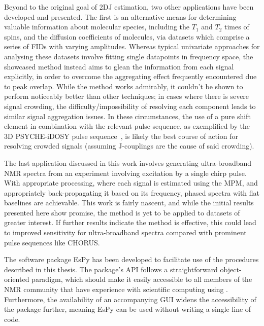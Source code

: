 Beyond to the original goal of \ac{2DJ} estimation, two other applications
have been developed and presented. The first is an alternative means for
determining valuable information about molecular species, including the $T_1$
and $T_2$ times of spins, and the diffusion coefficients of molecules, via
datasets which comprise a series of \acp{FID} with varying amplitudes. Whereas
typical univariate
approaches for analysing these datasets involve fitting single datapoints in
frequency space, the showcased method instead aims to glean the
information from each signal explicitly, in order to overcome the aggregating
effect frequently encountered due to peak overlap. While the method works
admirably,
it couldn't be shown to perform noticeably better than other techniques; in
cases where there is severe signal crowding, the difficulty/impossibility of
resolving each component leads to similar signal aggregation issues.
In these circumstances, the use of a pure shift element in
combination with the relevant pulse sequence, as exemplified by the
\ac{3D} \ac{PSYCHE}-i\ac{DOSY} pulse sequence~\cite{Foroozandeh2016}, is likely
the best course of action for resolving crowded signals (assuming J-couplings
are the cause of said crowding).

The last application discussed in this work involves generating ultra-broadband
\ac{NMR} spectra from an experiment involving excitation by a single chirp
pulse. With appropriate processing, where each signal is estimated using the
\ac{MPM}, and appropriately back-propagating it based on its frequency, phased
spectra with flat baselines are achievable.
This work is fairly nascent, and while the initial results presented here show
promise, the method is yet to be applied to datasets of greater interest. If
further results indicate the method is effective, this could lead to improved
sensitivity for ultra-broadband spectra compared with prominent pulse sequences
like \ac{CHORUS}.

The software package \ac{EsPy} has been developed to facilitate use of the
procedures described in this thesis. The package's \ac{API} follows a
straightforward object-oriented paradigm, which should make it easily
accessible to all members of the \ac{NMR} community that have experience with
scientific computing using \Python\!. Furthermore, the availability of an
accompanying \ac{GUI} widens the accessibility of the package further, meaning
\ac{EsPy} can be used without writing a single line of code.

